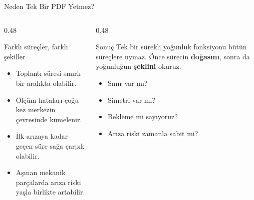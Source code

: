 \documentclass[light]{lutbeamer}
\begin{document}
\begin{frame}{Neden Tek Bir PDF Yetmez?}
    \small
    \begin{columns}[T]
        \begin{column}{0.48\textwidth}
            \begin{block}{Farklı süreçler, farklı şekiller}
                \begin{itemize}
                    \item Toplantı süresi sınırlı bir aralıkta olabilir.
                    \item Ölçüm hataları çoğu kez merkezin çevresinde kümelenir.
                    \item İlk arızaya kadar geçen süre sağa çarpık olabilir.
                    \item Aşınan mekanik parçalarda arıza riski yaşla birlikte artabilir.
                \end{itemize}
            \end{block}
        \end{column}
        \begin{column}{0.48\textwidth}
            \begin{alertblock}{Sonuç}
                Tek bir sürekli yoğunluk fonksiyonu bütün süreçlere uymaz.
                Önce sürecin \textbf{doğasını}, sonra da yoğunluğun \textbf{şeklini} okuruz.
            \end{alertblock}

            \vspace{0.3cm}
            \begin{itemize}
                \item Sınır var mı?
                \item Simetri var mı?
                \item Bekleme mi sayıyoruz?
                \item Arıza riski zamanla sabit mi?
            \end{itemize}
        \end{column}
    \end{columns}
\end{frame}
\end{document}
